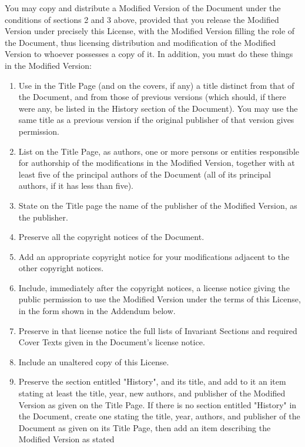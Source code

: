 You may copy and distribute a Modified Version of the Document under the
conditions of sections 2 and 3 above, provided that you release the
Modified Version under precisely this License, with the Modified Version
filling the role of the Document, thus licensing distribution and
modification of the Modified Version to whoever possesses a copy of it.
In addition, you must do these things in the Modified Version:

\begin{enumerate}
\def\labelenumi{\Alph{enumi}.}
\item
  Use in the Title Page (and on the covers, if any) a title distinct
  from that of the Document, and from those of previous versions (which
  should, if there were any, be listed in the History section of the
  Document). You may use the same title as a previous version if the
  original publisher of that version gives permission.
\item
  List on the Title Page, as authors, one or more persons or entities
  responsible for authorship of the modifications in the Modified
  Version, together with at least five of the principal authors of the
  Document (all of its principal authors, if it has less than five).
\item
  State on the Title page the name of the publisher of the Modified
  Version, as the publisher.
\item
  Preserve all the copyright notices of the Document.
\item
  Add an appropriate copyright notice for your modifications adjacent to
  the other copyright notices.
\item
  Include, immediately after the copyright notices, a license notice
  giving the public permission to use the Modified Version under the
  terms of this License, in the form shown in the Addendum below.
\item
  Preserve in that license notice the full lists of Invariant Sections
  and required Cover Texts given in the Document's license notice.
\item
  Include an unaltered copy of this License.
\item
  Preserve the section entitled "History", and its title, and add to it
  an item stating at least the title, year, new authors, and publisher
  of the Modified Version as given on the Title Page. If there is no
  section entitled "History" in the Document, create one stating the
  title, year, authors, and publisher of the Document as given on its
  Title Page, then add an item describing the Modified Version as stated

\end{enumerate}
